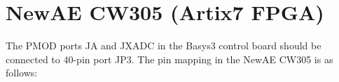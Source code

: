 \documentclass[letterpaper,10pt,english]{sphinxmanual}
\begin{document}
\section{NewAE CW305 (Artix7 FPGA)}
\label{\detokenize{dut_board_setup:newae-cw305-artix7-fpga}}
The PMOD ports JA and JXADC in the Basys3 control board should be connected to 40-pin port JP3.
The pin mapping in the NewAE CW305 is as follows:

\begin{sphinxVerbatim}[commandchars=\\\{\}]


\end{sphinxVerbatim}
\end{document}
